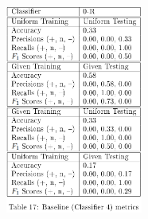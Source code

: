 \documentclass[11pt]{article}
\begin{document}
\begin{figure}[H]
	\centering
	\includegraphics[width = 0.4\textwidth]{c4m.png}
	\label{tbl:metrics-base10000}
\end{figure} 





\end{document}
